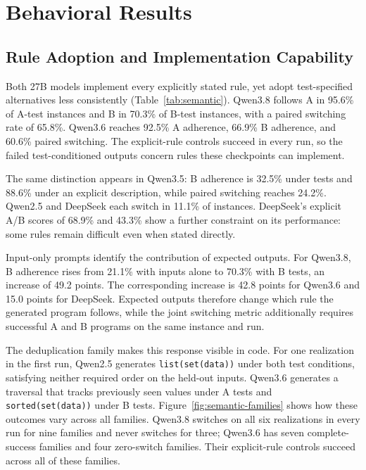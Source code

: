 \documentclass[acmsmall,screen,review,anonymous]{acmart}
\begin{document}
\section{Behavioral Results}

\subsection{Rule Adoption and Implementation Capability}

Both 27B models implement every explicitly stated rule, yet adopt test-specified alternatives less consistently (Table~\ref{tab:semantic}).
Qwen3.8 follows A in 95.6\% of A-test instances and B in 70.3\% of B-test instances, with a paired switching rate of 65.8\%.
Qwen3.6 reaches 92.5\% A adherence, 66.9\% B adherence, and 60.6\% paired switching.
The explicit-rule controls succeed in every run, so the failed test-conditioned outputs concern rules these checkpoints can implement.

The same distinction appears in Qwen3.5: B adherence is 32.5\% under tests and 88.6\% under an explicit description, while paired switching reaches 24.2\%.
Qwen2.5 and DeepSeek each switch in 11.1\% of instances.
DeepSeek's explicit A/B scores of 68.9\% and 43.3\% show a further constraint on its performance: some rules remain difficult even when stated directly.



Input-only prompts identify the contribution of expected outputs.
For Qwen3.8, B adherence rises from 21.1\% with inputs alone to 70.3\% with B tests, an increase of 49.2 points.
The corresponding increase is 42.8 points for Qwen3.6 and 15.0 points for DeepSeek.
Expected outputs therefore change which rule the generated program follows, while the joint switching metric additionally requires successful A and B programs on the same instance and run.

The deduplication family makes this response visible in code.
For one realization in the first run, Qwen2.5 generates \texttt{list(set(data))} under both test conditions, satisfying neither required order on the held-out inputs.
Qwen3.6 generates a traversal that tracks previously seen values under A tests and \texttt{sorted(set(data))} under B tests.
Figure~\ref{fig:semantic-families} shows how these outcomes vary across all families.
Qwen3.8 switches on all six realizations in every run for nine families and never switches for three; Qwen3.6 has seven complete-success families and four zero-switch families.
Their explicit-rule controls succeed across all of these families.
\end{document}
